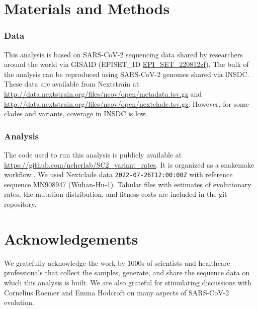 \documentclass[aps,rmp, twocolumn]{revtex4}
\begin{document}
\section*{Materials and Methods}

\subsubsection*{Data}
This analysis is based on SARS-CoV-2 sequencing data shared by researchers around the world via GISAID \citep{shu_gisaid_2017} (EPISET\_ID \href{10.55876/gis8.220812zf}{EPI_SET_220812zf}).
The bulk of the analysis can be reproduced using SARS-CoV-2 genomes shared via INSDC.
These data are available from Nextstrain at \url{http://data.nextstrain.org/files/ncov/open/metadata.tsv.gz} and \url{http://data.nextstrain.org/files/ncov/open/nextclade.tsv.gz}.
However, for some clades and variants, coverage in INSDC is low.

\subsubsection*{Analysis}
The code used to run this analysis is publicly available at \url{https://github.com/neherlab/SC2_variant_rates}.
It is organized as a snakemake workflow \citep{koster_snakemakescalable_2012}.
We used Nextclade data \texttt{2022-07-26T12:00:00Z} with reference sequence MN908947 (Wuhan-Hu-1).
Tabular files with estimates of evolutionary rates, the mutation distribution, and fitness costs are included in the git repository.

\section*{Acknowledgements}
We gratefully acknowledge the work by 1000s of scientists and healthcare professionals that collect the samples, generate, and share the sequence data on which this analysis is built.
We are also grateful for stimulating discussions with Cornelius Roemer and Emma Hodcroft on many aspects of SARS-CoV-2 evolution.



\clearpage
\appendix

\clearpage
\onecolumngrid

% 
\end{document}
